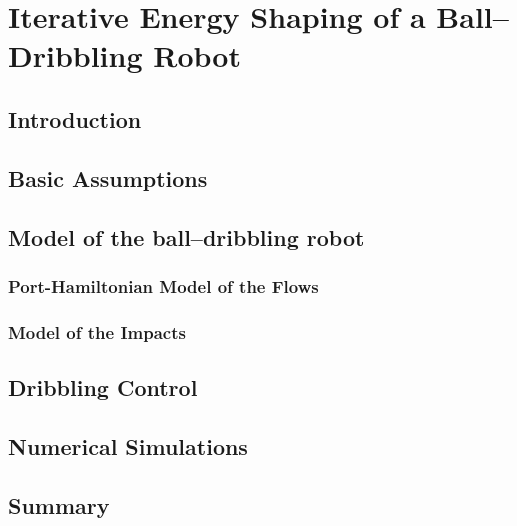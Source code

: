 
\chapter{Iterative Energy Shaping of a Ball--Dribbling Robot}

\label{chap:multistable}
\minitoc

\thispagestyle{empty}

\newpage
\section{Introduction}
%

\section{Basic Assumptions}
%
\section{Model of the ball--dribbling robot}\label{sec:DBR}
\subsection{Port-Hamiltonian Model of the Flows}
\subsection{Model of the Impacts}

\section{Dribbling Control}\label{sec:control}

\section{Numerical Simulations}

\section{Summary}
